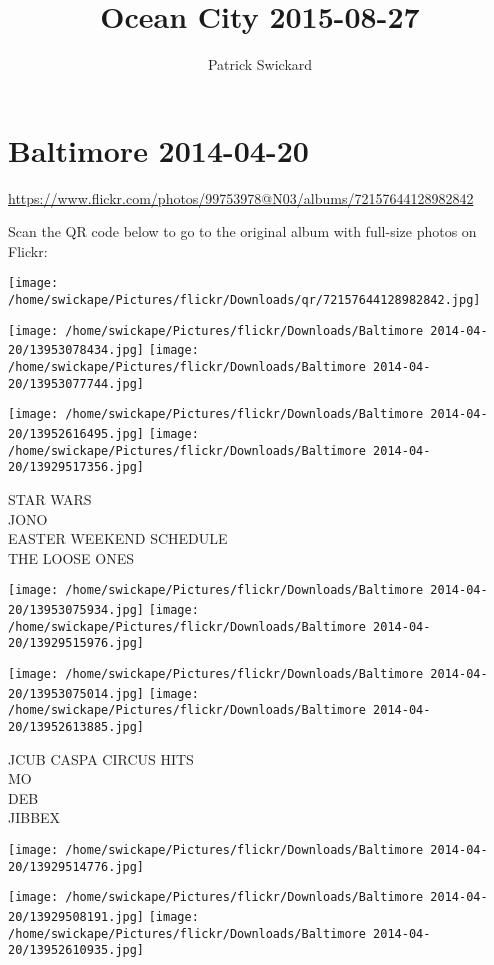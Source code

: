 \documentclass[10pt,letterpaper]{article}
\title{Ocean City 2015-08-27}
\author{Patrick Swickard}
\date{}
\begin{document}
\section*{Baltimore 2014-04-20}

\url{https://www.flickr.com/photos/99753978@N03/albums/72157644128982842}

Scan the QR code below to go to the original album with full-size photos on Flickr:

\texttt{[image: /home/swickape/Pictures/flickr/Downloads/qr/72157644128982842.jpg]}
\pagebreak

\texttt{[image: /home/swickape/Pictures/flickr/Downloads/Baltimore 2014-04-20/13953078434.jpg]}
\texttt{[image: /home/swickape/Pictures/flickr/Downloads/Baltimore 2014-04-20/13953077744.jpg]}

\texttt{[image: /home/swickape/Pictures/flickr/Downloads/Baltimore 2014-04-20/13952616495.jpg]}
\texttt{[image: /home/swickape/Pictures/flickr/Downloads/Baltimore 2014-04-20/13929517356.jpg]}

STAR WARS\\
JONO\\
EASTER WEEKEND SCHEDULE\\
THE LOOSE ONES
\pagebreak

\texttt{[image: /home/swickape/Pictures/flickr/Downloads/Baltimore 2014-04-20/13953075934.jpg]}
\texttt{[image: /home/swickape/Pictures/flickr/Downloads/Baltimore 2014-04-20/13929515976.jpg]}

\texttt{[image: /home/swickape/Pictures/flickr/Downloads/Baltimore 2014-04-20/13953075014.jpg]}
\texttt{[image: /home/swickape/Pictures/flickr/Downloads/Baltimore 2014-04-20/13952613885.jpg]}

JCUB CASPA CIRCUS HITS\\
MO\\
DEB\\
JIBBEX
\pagebreak

\texttt{[image: /home/swickape/Pictures/flickr/Downloads/Baltimore 2014-04-20/13929514776.jpg]}

\vspace{0.25in}
\texttt{[image: /home/swickape/Pictures/flickr/Downloads/Baltimore 2014-04-20/13929508191.jpg]}
\texttt{[image: /home/swickape/Pictures/flickr/Downloads/Baltimore 2014-04-20/13952610935.jpg]}
\end{document}
